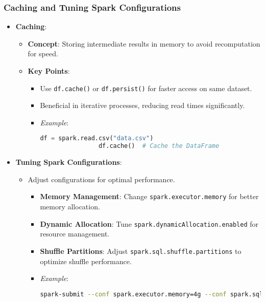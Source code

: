 \documentclass[aspectratio=169]{beamer}
\begin{document}
\begin{frame}[fragile]
    \frametitle{Caching and Tuning Spark Configurations}
    \begin{itemize}
        \item \textbf{Caching}:
        \begin{itemize}
            \item \textbf{Concept}: Storing intermediate results in memory to avoid recomputation for speed.
            \item \textbf{Key Points}:
            \begin{itemize}
                \item Use \texttt{df.cache()} or \texttt{df.persist()} for faster access on same dataset.
                \item Beneficial in iterative processes, reducing read times significantly.
                \item \textit{Example}:
                \begin{lstlisting}[language=python]
                df = spark.read.csv("data.csv")
                df.cache()  # Cache the DataFrame
                \end{lstlisting}
            \end{itemize}
        \end{itemize}

        \item \textbf{Tuning Spark Configurations}:
        \begin{itemize}
            \item Adjust configurations for optimal performance.
            \begin{itemize}
                \item \textbf{Memory Management}: Change \texttt{spark.executor.memory} for better memory allocation.
                \item \textbf{Dynamic Allocation}: Tune \texttt{spark.dynamicAllocation.enabled} for resource management.
                \item \textbf{Shuffle Partitions}: Adjust \texttt{spark.sql.shuffle.partitions} to optimize shuffle performance.
                \item \textit{Example}:
                \begin{lstlisting}[language=bash]
                spark-submit --conf spark.executor.memory=4g --conf spark.sql.shuffle.partitions=100 my_script.py
                \end{lstlisting}
            \end{itemize}
        \end{itemize}
    \end{itemize}
\end{frame}
\end{document}
